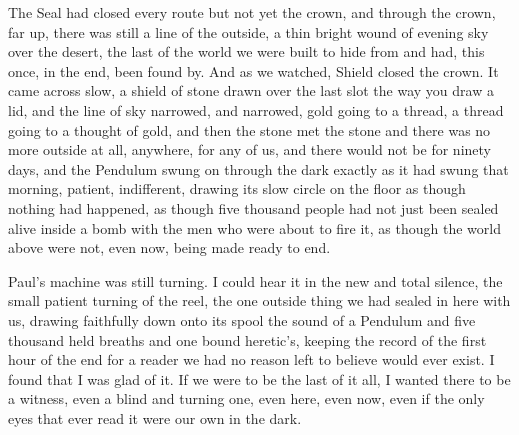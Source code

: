 The Seal had closed every route but not yet the crown, and through the crown, far up, there was still a line of the outside, a thin bright wound of evening sky over the desert, the last of the world we were built to hide from and had, this once, in the end, been found by. And as we watched, Shield closed the crown. It came across slow, a shield of stone drawn over the last slot the way you draw a lid, and the line of sky narrowed, and narrowed, gold going to a thread, a thread going to a thought of gold, and then the stone met the stone and there was no more outside at all, anywhere, for any of us, and there would not be for ninety days, and the Pendulum swung on through the dark exactly as it had swung that morning, patient, indifferent, drawing its slow circle on the floor as though nothing had happened, as though five thousand people had not just been sealed alive inside a bomb with the men who were about to fire it, as though the world above were not, even now, being made ready to end.\par

Paul's machine was still turning. I could hear it in the new and total silence, the small patient turning of the reel, the one outside thing we had sealed in here with us, drawing faithfully down onto its spool the sound of a Pendulum and five thousand held breaths and one bound heretic's, keeping the record of the first hour of the end for a reader we had no reason left to believe would ever exist. I found that I was glad of it. If we were to be the last of it all, I wanted there to be a witness, even a blind and turning one, even here, even now, even if the only eyes that ever read it were our own in the dark.\par

